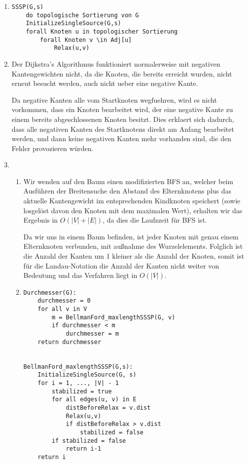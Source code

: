 \documentclass{article}
\begin{document}
\begin{enumerate}[\bfseries1.]
\item 
\begin{verbatim}
SSSP(G,s)
    do topologische Sortierung von G
    InitializeSingleSource(G,s)
    forall Knoten u in topologischer Sortierung
        forall Knoten v \in Adj[u]
            Relax(u,v)
\end{verbatim}

\item

Der Dijkstra's Algorithmus funktioniert normalerweise mit negativen Kantengewichten nicht,
da die Knoten, die bereits erreicht wurden, nicht erneut besucht werden, auch nicht ueber 
eine negative Kante.

Da negative Kanten alle vom Startknoten wegfuehren, wird es nicht
vorkommen, dass ein Knoten bearbeitet wird, der eine negative Kante zu einem
bereits abgeschlossenen Knoten besitzt.
Dies erklaert sich dadurch, dass alle negativen Kanten des Startknotens direkt 
am Anfang bearbeitet werden, und dann keine negativen Kanten mehr vorhanden sind, 
die den Fehler provozieren würden.

\item 
    \begin{enumerate}
      \item
        Wir wenden auf den Baum einen modifizierten BFS an, welcher beim
        Ausführen der Breitensuche den Abstand des Elternknotens plus das aktuelle
        Kantengewicht im entsprechenden Kindknoten speichert (sowie losgelöst
        davon den Knoten mit dem maximalen Wert), erhalten wir das
        Ergebnis in $O(|V| + |E|)$, da dies die Laufzzeit für BFS ist.
        
        Da wir uns in einem Baum befinden, ist jeder Knoten mit genau einem
        Elternknoten verbunden, mit außnahme des Wurzelelements. Folglich ist
        die Anzahl der Kanten um 1 kleiner als die Anzahl der Knoten, somit ist
        für die Landau-Notation die Anzahl der Kanten nicht weiter von Bedeutung
        und das Verfahren liegt in $O(|V|)$.
        
        
      
      \item 

\begin{verbatim}
Durchmesser(G):
    durchmesser = 0
    for all v in V
        m = BellmanFord_maxlengthSSSP(G, v)
        if durchmesser < m
            durchmesser = m
    return durchmesser


BellmanFord_maxlengthSSSP(G,s):
    InitializeSingleSource(G, s)
    for i = 1, ..., |V| - 1
        stabilized = true
        for all edges(u, v) in E
            distBeforeRelax = v.dist
            Relax(u,v)
            if distBeforeRelax > v.dist
                stabilized = false
        if stabilized = false
            return i-1
    return i
\end{verbatim}


\end{enumerate}
\end{enumerate}
\end{document}
